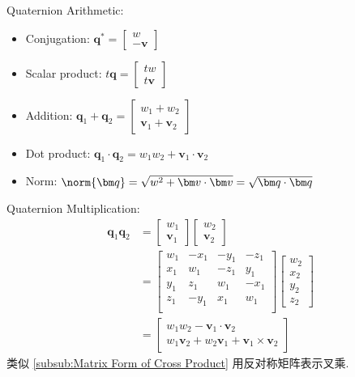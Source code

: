 Quaternion Arithmetic:
\begin{itemize}
    \item Conjugation: $\bm q^*=\begin{bmatrix}
        w\\ -\bm v
    \end{bmatrix}$
    \item Scalar product: $t\bm q = \begin{bmatrix}
        tw\\ t\bm v
    \end{bmatrix}$
    \item Addition: $\bm q_1 + \bm q_2= \begin{bmatrix}
        w_1+w_2\\ \bm v_1+\bm v_2
    \end{bmatrix}$
    \item Dot product: $\bm q_1\cdot \bm q_2 = w_1w_2+\bm v_1\cdot\bm v_2$
    \item Norm: $\norm{\bm q}=\sqrt{w^2+\bm v\cdot \bm v}=\sqrt{\bm q \cdot \bm q}$
\end{itemize}

Quaternion Multiplication:
\begin{align*}
    \bm q_1\bm q_2&=\begin{bmatrix}
        w_1\\ \bm v_1
    \end{bmatrix}\begin{bmatrix}
        w_2\\ \bm v_2
    \end{bmatrix}\\
    &=\begin{bmatrix}
        w_1 & -x_1 & -y_1 & -z_1 \\
        x_1 &  w_1 & -z_1 &  y_1 \\
        y_1 &  z_1 &  w_1 & -x_1 \\
        z_1 & -y_1 &  x_1 &  w_1 \\
    \end{bmatrix}\begin{bmatrix}
        w_2\\x_2\\y_2\\z_2
    \end{bmatrix}\\
    &=\begin{bmatrix}
        w_1w_2-\bm v_1\cdot\bm v_2\\
        w_1\bm v_2+w_2\bm v_1+\bm v_1\times \bm v_2
    \end{bmatrix}
\end{align*}
类似 \ref{subsub:Matrix Form of Cross Product} 用反对称矩阵表示叉乘.

